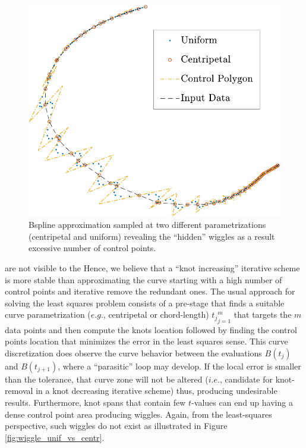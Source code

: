 \documentclass[a4paper,12pt]{article}
\begin{document}
 
 \begin{figure}
  
  \includegraphics{wiggle_ALL-crop}
  \caption{\label{fig:bspline_wiggle}Bspline approximation sampled at two different parametrizations (centripetal and uniform) revealing the ``hidden'' wiggles as a result excessive number 
  of control points.}
 \end{figure}

 
 
 are not visible to the 
Hence, we believe that 
a ``knot increasing'' iterative scheme is more stable than approximating the curve starting with a high number of control points and iterative remove the redundant ones. 
The usual approach for solving the least squares problem consists of a pre-stage that finds a suitable curve parametrization ($e.g.$, centripetal or chord-length)  ${t_j}_{j=1}^m$ that targets the $m$ data points and
then compute the knots location followed by finding the control points location that minimizes the error in the least squares sense. 
This curve discretization does observe the curve behavior between the evaluations $B(t_j)$ and $B(t_{j+1})$, where a ``parasitic'' loop may develop. If the local error is smaller than the tolerance, that 
curve zone will not be altered ($i.e.$, candidate for knot-removal in a knot decreasing iterative scheme) thus, producing undesirable results. Furthermore, knot spans that contain few $t$-values can end up having a dense control point area 
producing wiggles. Again, from the least-squares perspective, such wiggles do not exist as illustrated in Figure \ref{fig:wiggle_unif_vs_centr}.
\end{document}
